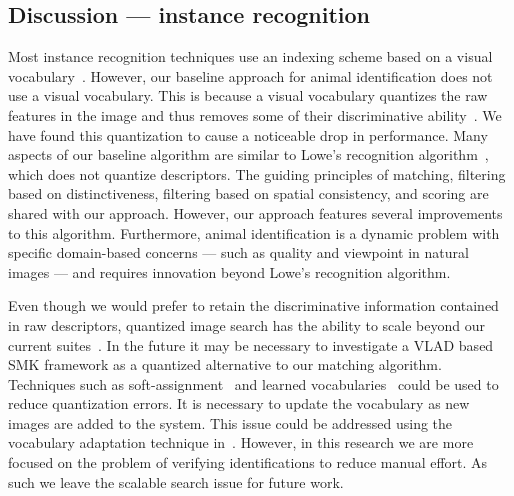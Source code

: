     \subsection{Discussion --- instance recognition}
        Most instance recognition techniques use an indexing scheme based on a visual
        vocabulary~\cite{tolias_image_2015, jegou_hamming_2008, philbin_object_2007, cao_learning_2012,
        arandjelovic_all_2013, jegou_negative_2012, chum_fast_2012, gong_multi_scale_2014}. However, our baseline
        approach for animal identification does not use a visual vocabulary. This is because a visual vocabulary
        quantizes the raw features in the image and thus removes some of their discriminative
        ability~\cite{philbin_lost_2008, boiman_defense_2008}. We have found this quantization to cause a
        noticeable drop in performance. Many aspects of our baseline algorithm are similar to Lowe's recognition
        algorithm~\cite{lowe_distinctive_2004}, which does not quantize descriptors. The guiding principles of
        matching, filtering based on distinctiveness, filtering based on spatial consistency, and scoring are
        shared with our approach. However, our approach features several improvements to this algorithm.
        Furthermore, animal identification is a dynamic problem with specific domain-based concerns --- such as
        quality and viewpoint in natural images --- and requires innovation beyond Lowe's recognition algorithm.

        Even though we would prefer to retain the discriminative information contained in raw descriptors,
        quantized image search has the ability to scale beyond our current suites~\cite{chum_fast_2012,
        perronnin_large_scale_2010_1, tolias_image_2015}. In the future it may be necessary to investigate a VLAD
        based SMK framework as a quantized alternative to our matching algorithm. Techniques such as
        soft-assignment~\cite{philbin_lost_2008} and learned vocabularies~\cite{mikulik_learning_2010} could be
        used to reduce quantization errors. It is necessary to update the vocabulary as new images are added to the
        system. This issue could be addressed using the vocabulary adaptation technique
        in~\cite{arandjelovic_all_2013}. However, in this research we are more focused on the problem of verifying
        identifications to reduce manual effort. As such we leave the scalable search issue for future work.

